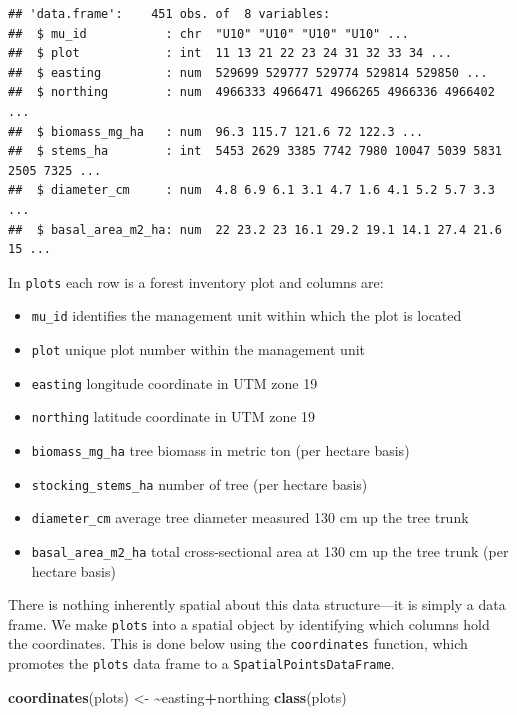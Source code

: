 \documentclass[
]{krantz}
\newenvironment{Shaded}{\begin{snugshade}}{\end{snugshade}}
\newcommand{\ErrorTok}[1]{\textcolor[rgb]{0.64,0.00,0.00}{\textbf{#1}}}
\newcommand{\KeywordTok}[1]{\textcolor[rgb]{0.13,0.29,0.53}{\textbf{#1}}}
\newcommand{\NormalTok}[1]{#1}
\newcommand{\OperatorTok}[1]{\textcolor[rgb]{0.81,0.36,0.00}{\textbf{#1}}}
\newcommand{\StringTok}[1]{\textcolor[rgb]{0.31,0.60,0.02}{#1}}
\providecommand{\tightlist}{%
  \setlength{\itemsep}{0pt}\setlength{\parskip}{0pt}}
\begin{document}
\begin{verbatim}
## 'data.frame':    451 obs. of  8 variables:
##  $ mu_id           : chr  "U10" "U10" "U10" "U10" ...
##  $ plot            : int  11 13 21 22 23 24 31 32 33 34 ...
##  $ easting         : num  529699 529777 529774 529814 529850 ...
##  $ northing        : num  4966333 4966471 4966265 4966336 4966402 ...
##  $ biomass_mg_ha   : num  96.3 115.7 121.6 72 122.3 ...
##  $ stems_ha        : int  5453 2629 3385 7742 7980 10047 5039 5831 2505 7325 ...
##  $ diameter_cm     : num  4.8 6.9 6.1 3.1 4.7 1.6 4.1 5.2 5.7 3.3 ...
##  $ basal_area_m2_ha: num  22 23.2 23 16.1 29.2 19.1 14.1 27.4 21.6 15 ...
\end{verbatim}

In \texttt{plots} each row is a forest inventory plot and columns are:

\begin{itemize}
\tightlist
\item
  \texttt{mu\_id} identifies the management unit within which the plot is located
\item
  \texttt{plot} unique plot number within the management unit
\item
  \texttt{easting} longitude coordinate in UTM zone 19
\item
  \texttt{northing} latitude coordinate in UTM zone 19
\item
  \texttt{biomass\_mg\_ha} tree biomass in metric ton (per hectare basis)
\item
  \texttt{stocking\_stems\_ha} number of tree (per hectare basis)
\item
  \texttt{diameter\_cm} average tree diameter measured 130 cm up the tree trunk
\item
  \texttt{basal\_area\_m2\_ha} total cross-sectional area at 130 cm up the tree trunk (per hectare basis)
\end{itemize}

There is nothing inherently spatial about this data structure---it is simply a data frame. We make \texttt{plots} into a spatial object by identifying which columns hold the coordinates. This is done below using the \texttt{coordinates} function, which promotes the \texttt{plots} data frame to a \texttt{SpatialPointsDataFrame}.

\begin{Shaded}
\begin{Highlighting}[]
\KeywordTok{coordinates}\NormalTok{(plots) \textless{}{-}}\StringTok{ }\ErrorTok{\textasciitilde{}}\NormalTok{easting}\OperatorTok{+}\NormalTok{northing}
\KeywordTok{class}\NormalTok{(plots)}
\end{Highlighting}
\end{Shaded}
\end{document}
